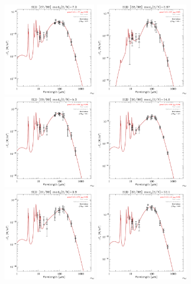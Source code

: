 \documentclass[preprint2,longabstract]{aastex}
\begin{document}
\begin{figure}
    \includegraphics[trim=0 2mm 0 0, clip, width=40mm]{SEDs/sed_27.pdf}
	\includegraphics[trim=0 2mm 0 0, clip, width=40mm]{SEDs/sed_28.pdf}
	\includegraphics[trim=0 2mm 0 0, clip, width=40mm]{SEDs/sed_29.pdf}
	\includegraphics[trim=0 2mm 0 0, clip, width=40mm]{SEDs/sed_30.pdf}
	\includegraphics[trim=0 2mm 0 0, clip, width=40mm]{SEDs/sed_31.pdf}
	\includegraphics[trim=0 2mm 0 0, clip, width=40mm]{SEDs/sed_32.pdf}

\end{figure}
\end{document}

